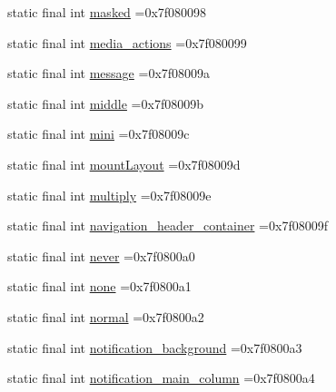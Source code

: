 \begin{DoxyCompactItemize}
static final int \mbox{\hyperlink{classcom_1_1example_1_1trainawearapplication_1_1_r_1_1id_a4a54eaa151f9e1842d480712976ea86b}{masked}} =0x7f080098
\item 
static final int \mbox{\hyperlink{classcom_1_1example_1_1trainawearapplication_1_1_r_1_1id_af389fe86a5bf28a871b1239154f98518}{media\+\_\+actions}} =0x7f080099
\item 
static final int \mbox{\hyperlink{classcom_1_1example_1_1trainawearapplication_1_1_r_1_1id_ac1f8a52fadacbe41ff62be1107c819a5}{message}} =0x7f08009a
\item 
static final int \mbox{\hyperlink{classcom_1_1example_1_1trainawearapplication_1_1_r_1_1id_a86689f130af73b24ca7c4fba28f1ea78}{middle}} =0x7f08009b
\item 
static final int \mbox{\hyperlink{classcom_1_1example_1_1trainawearapplication_1_1_r_1_1id_af16854273b240b72cedbb40e2121a505}{mini}} =0x7f08009c
\item 
static final int \mbox{\hyperlink{classcom_1_1example_1_1trainawearapplication_1_1_r_1_1id_a54b3b15b617f13886a7516945f87e231}{mount\+Layout}} =0x7f08009d
\item 
static final int \mbox{\hyperlink{classcom_1_1example_1_1trainawearapplication_1_1_r_1_1id_affd70f0204fae4a8a9d6121d23c6d61c}{multiply}} =0x7f08009e
\item 
static final int \mbox{\hyperlink{classcom_1_1example_1_1trainawearapplication_1_1_r_1_1id_a98e5c8aa566d20b2f244084d73bfbd5b}{navigation\+\_\+header\+\_\+container}} =0x7f08009f
\item 
static final int \mbox{\hyperlink{classcom_1_1example_1_1trainawearapplication_1_1_r_1_1id_a8e66202b23dfb639f9ea6074abbcedad}{never}} =0x7f0800a0
\item 
static final int \mbox{\hyperlink{classcom_1_1example_1_1trainawearapplication_1_1_r_1_1id_a96081210b11b70bf675c6a3d675dd668}{none}} =0x7f0800a1
\item 
static final int \mbox{\hyperlink{classcom_1_1example_1_1trainawearapplication_1_1_r_1_1id_a689b4457ee0063e91c2eac3785fd82fe}{normal}} =0x7f0800a2
\item 
static final int \mbox{\hyperlink{classcom_1_1example_1_1trainawearapplication_1_1_r_1_1id_ae32a2c4e05fb0a85a9988c30cca20fc3}{notification\+\_\+background}} =0x7f0800a3
\item 
static final int \mbox{\hyperlink{classcom_1_1example_1_1trainawearapplication_1_1_r_1_1id_a9d1a59bda0ac210d6f19395bb3b7f096}{notification\+\_\+main\+\_\+column}} =0x7f0800a4
\item 

\end{DoxyCompactItemize}
